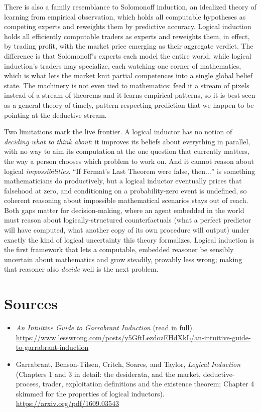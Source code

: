 \documentclass[10pt]{article}
\theoremstyle{definition}
\theoremstyle{remark}
\begin{document}
There is also a family resemblance to Solomonoff induction, an idealized theory of learning from empirical observation, which holds all computable hypotheses as competing experts and reweights them by predictive accuracy. Logical induction holds all efficiently computable traders as experts and reweights them, in effect, by trading profit, with the market price emerging as their aggregate verdict. The difference is that Solomonoff's experts each model the entire world, while logical induction's traders may specialize, each watching one corner of mathematics, which is what lets the market knit partial competences into a single global belief state. The machinery is not even tied to mathematics: feed it a stream of pixels instead of a stream of theorems and it learns empirical patterns, so it is best seen as a general theory of timely, pattern-respecting prediction that we happen to be pointing at the deductive stream.

Two limitations mark the live frontier. A logical inductor has no notion of \emph{deciding what to think about}: it improves its beliefs about everything in parallel, with no way to aim its computation at the one question that currently matters, the way a person chooses which problem to work on. And it cannot reason about logical \emph{impossibilities}. ``If Fermat's Last Theorem were false, then$\dots$'' is something mathematicians do productively, but a logical inductor eventually prices that falsehood at zero, and conditioning on a probability-zero event is undefined, so coherent reasoning about impossible mathematical scenarios stays out of reach. Both gaps matter for decision-making, where an agent embedded in the world must reason about logically-structured counterfactuals (what a perfect predictor will have computed, what another copy of its own procedure will output) under exactly the kind of logical uncertainty this theory formalizes. Logical induction is the first framework that lets a computable, embedded reasoner be sensibly uncertain about mathematics and grow steadily, provably less wrong; making that reasoner also \emph{decide} well is the next problem.

\section*{Sources}

\begin{itemize}[leftmargin=1.5em]
\item \emph{An Intuitive Guide to Garrabrant Induction} (read in full). \url{https://www.lesswrong.com/posts/y5GftLezdozEHdXkL/an-intuitive-guide-to-garrabrant-induction}
\item Garrabrant, Benson-Tilsen, Critch, Soares, and Taylor, \emph{Logical Induction} (Chapters 1 and 3 in detail: the desiderata, and the market, deductive-process, trader, exploitation definitions and the existence theorem; Chapter 4 skimmed for the properties of logical inductors). \url{https://arxiv.org/pdf/1609.03543}
\end{itemize}
\end{document}
